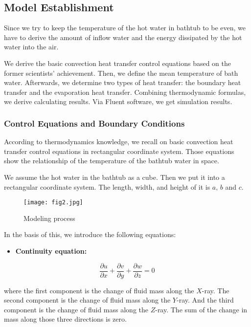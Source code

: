 \documentclass{mcmthesis}
\begin{document}
\subsection{Model Establishment}

Since we try to keep the temperature of the hot water in bathtub to be even, 
we have to derive the amount of inflow water and the energy dissipated by the 
hot water into the air.

We derive the basic convection heat transfer control equations based on the 
former scientists’ achievement. Then, we define the mean temperature of bath 
water. Afterwards, we determine two types of heat transfer: the boundary heat 
transfer and the evaporation heat transfer. Combining thermodynamic formulas, 
we derive calculating results. Via Fluent software, we get simulation results.

\subsubsection{Control Equations and Boundary Conditions}

According to thermodynamics knowledge, we recall on basic convection
heat transfer control equations in rectangular coordinate system. Those
equations show the relationship of the temperature of the bathtub water in space.

We assume the hot water in the bathtub as a cube. Then we put it into a
rectangular coordinate system. The length, width, and height of it is $a,\, b$ 
and $c$.

\begin{figure}[h] 
\centering
\texttt{[image: fig2.jpg]}
\caption{Modeling process} \label{fig2}
\end{figure}

In the basis of this, we introduce the following equations:

\begin{itemize}
\item {\bf Continuity equation:}
\end{itemize}

\begin{equation} \label{eq1}
\frac{\partial u}{\partial x} + \frac{\partial v}{\partial y} +
\frac{\partial w}{\partial z} = 0
\end{equation}

\noindent where the first component is the change of fluid mass along the $X$-ray. 
The second component is the change of fluid mass along the $Y$-ray. And the third 
component is the change of fluid mass along the $Z$-ray. The sum of the change in 
mass along those three directions is zero.
\end{document}
